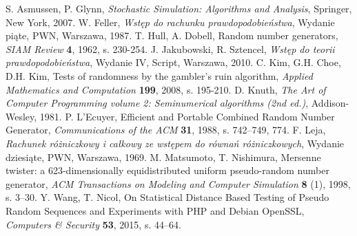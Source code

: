 \documentclass[a4paper,11pt,twoside]{book}
\theoremstyle{definition}
\begin{document}
\begin{thebibliography}{99}
    S. Asmussen, P. Glynn, \emph{Stochastic Simulation: Algorithms and Analysis}, Springer, New York, 2007.
    W. Feller, \emph{Wstęp do rachunku prawdopodobieństwa}, Wydanie piąte, PWN, Warszawa, 1987.
    T. Hull, A. Dobell, Random number generators, \emph{SIAM Review} \textbf{4}, 1962, s. 230-254.
    J. Jakubowski, R. Sztencel, \emph{Wstęp do teorii prawdopodobieństwa}, Wydanie IV, Script, Warszawa, 2010.
    C. Kim, G.H. Choe, D.H. Kim, Tests of randomness by the gambler's ruin algorithm,  \emph{Applied Mathematics and Computation} \textbf{199}, 2008, s. 195-210.
    D. Knuth, \emph{The Art of Computer Programming volume 2: Seminumerical algorithms (2nd ed.)}, Addison-Wesley, 1981.
    P. L'Ecuyer, Efficient and Portable Combined Random Number Generator, \emph{Communications of the ACM} \textbf{31}, 1988, s. 742–749, 774.
    F. Leja, \emph{Rachunek różniczkowy i całkowy ze wstępem do równań różniczkowych}, Wydanie dziesiąte, PWN, Warszawa, 1969.
    M. Matsumoto, T. Nishimura, Mersenne twister: a 623-dimensionally equidistributed uniform pseudo-random number generator, \emph{ACM Transactions on Modeling and Computer Simulation} \textbf{8} (1), 1998, s. 3–30.
    Y. Wang, T. Nicol, On Statistical Distance Based Testing of Pseudo Random Sequences and Experiments with PHP and Debian OpenSSL, \emph{Computers \& Security} \textbf{53}, 2015, s. 44--64.

\end{thebibliography}
\end{document}
